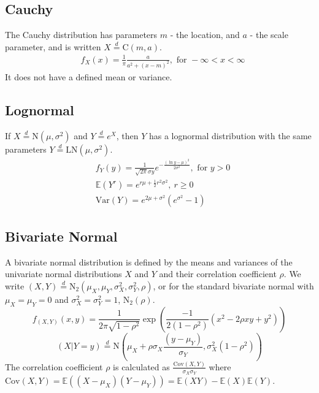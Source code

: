 \documentclass[titlepage,twocolumn]{article}
\begin{document}
\subsection*{Cauchy}
The Cauchy distribution has parameters $m$ - the location, and $a$ - the scale parameter, and is written $X\stackrel{d}{=}\mbox{C}(m, a)$.
\begin{align*}
    &f_X(x)=\frac{1}{\pi} \frac{a}{a^2 + (x-m)^2}, \mbox{ for } -\infty < x < \infty
\end{align*}
It does not have a defined mean or variance.

\subsection*{Lognormal}
If $X \stackrel{d}{=} \mbox{N}(\mu, \sigma^2)$ and $Y \stackrel{d}{=} e^X$, then $Y$ has a lognormal distribution with the same parameters $Y \stackrel{d}{=} \mbox{LN}(\mu, \sigma^2)$.
\begin{align*}
    &f_Y(y)=\frac{1}{\sqrt{2\pi}\sigma y}e^{-\frac{(\ln y - \mu)^2}{2\sigma^2}}, \mbox{ for } y > 0\\
    &\mathbb{E}(Y^r)=e^{r\mu + \frac{1}{2}r^2 \sigma^2},\ r \geq 0\\
    &\mbox{Var}(Y)=e^{2\mu + \sigma^2}(e^{\sigma^2}-1)
\end{align*}

\subsection*{Bivariate Normal}
A bivariate normal distribution is defined by the means and variances of the univariate normal distributions $X$ and $Y$ and their correlation coefficient $\rho$. We write $(X,Y) \stackrel{d}{=} \mbox{N}_{2}(\mu_X, \mu_Y, \sigma^2_X, \sigma^2_Y, \rho)$, or for the standard bivariate normal with $\mu_X = \mu_Y = 0$ and $\sigma^2_X = \sigma^2_Y = 1$, $\mbox{N}_{2}(\rho)$.
$$
f_{(X,Y)}(x,y)=\frac{1}{2 \pi \sqrt{1 - \rho^2}}\exp{\left(\frac{-1}{2(1-\rho^2)}(x^2 - 2 \rho x y + y^2)\right)}$$ $$
(X|Y=y) \stackrel{d}{=} \mbox{N}(\mu_X + \rho \sigma_X \frac{(y-\mu_Y)}{\sigma_Y}, \sigma_X^2(1-\rho^2))
$$
The correlation coefficient $\rho$ is calculated as $\frac{\mbox{Cov}(X,Y)}{\sigma_X \sigma_Y}$ where $\mbox{Cov}(X,Y) = \mathbb{E}((X-\mu_X)(Y-\mu_Y)) = \mathbb{E}(XY) - \mathbb{E}(X)\mathbb{E}(Y)$.
\end{document}
